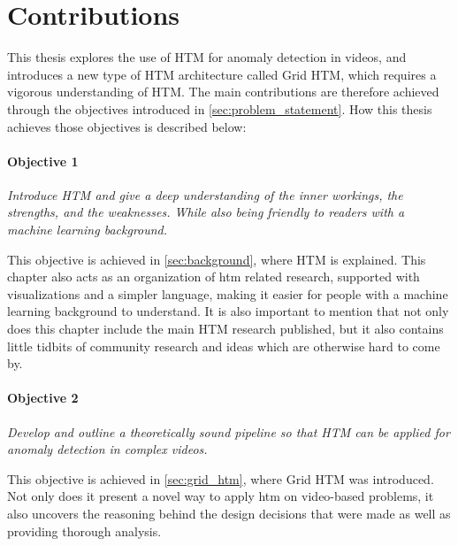\section{Contributions}
This thesis explores the use of HTM for anomaly detection in videos, and introduces a new type of HTM architecture called Grid HTM, which requires a vigorous understanding of HTM. The main contributions are therefore achieved through the objectives introduced in \autoref{sec:problem_statement}. How this thesis achieves those objectives is described below:
\paragraph*{Objective 1} \emph{Introduce HTM and give a deep understanding of the inner workings, the strengths, and the weaknesses. While also being friendly to readers with a machine learning background.}
\par
This objective is achieved in \autoref{sec:background}, where HTM is explained. This chapter also acts as an organization of  \gls*{htm} related research, supported with visualizations and a simpler language, making it easier for people with a machine learning background to understand. It is also important to mention that not only does this chapter include the main HTM research published, but it also contains little tidbits of community research and ideas which are otherwise hard to come by.
\paragraph*{Objective 2} \emph{Develop and outline a theoretically sound pipeline so that HTM can be applied for anomaly detection in complex videos.}
\par
This objective is achieved in \autoref{sec:grid_htm}, where Grid HTM was introduced. Not only does it present a novel way to apply  \gls*{htm} on video-based problems, it also uncovers the reasoning behind the design decisions that were made as well as providing thorough analysis.
